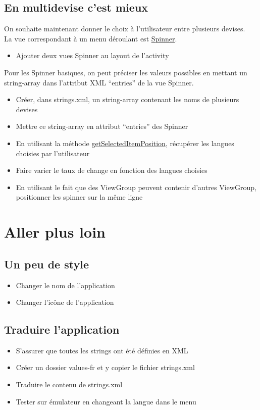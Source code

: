 \documentclass{article}
\begin{document}
\subsection{En multidevise c'est mieux}
On souhaite maintenant donner le choix à l'utilisateur entre plusieurs
devises.\\
La vue correspondant à un menu déroulant est
\href{http://developer.android.com/guide/topics/ui/controls/spinner.html}{Spinner}.
\begin{itemize}
\item Ajouter deux vues Spinner au layout de l'activity
\end{itemize}
Pour les Spinner basiques, on peut préciser les valeurs possibles en
mettant un string-array dans l'attribut XML ``entries'' de la vue Spinner.
\begin{itemize}
\item Créer, dans strings.xml, un string-array contenant les noms de plusieurs
devises
\item Mettre ce string-array en attribut ``entries'' des Spinner
\item En utilisant la méthode
\href{http://developer.android.com/reference/android/widget/AdapterView.html#getSelectedItemPosition()}{getSelectedItemPosition}, récupérer les langues choisies par l'utilisateur
\item Faire varier le taux de change en fonction des langues choisies
\item En utilisant le fait que des ViewGroup peuvent contenir d'autres
ViewGroup, positionner les spinner sur la même ligne
\end{itemize}
\section{Aller plus loin}
\subsection{Un peu de style}
\begin{itemize}
\item Changer le nom de l'application
\item Changer l'icône de l'application
\end{itemize}
\subsection{Traduire l'application}
\begin{itemize}
\item S'assurer que toutes les strings ont été définies en XML
\item Créer un dossier values-fr et y copier le fichier strings.xml
\item Traduire le contenu de strings.xml
\item Tester sur émulateur en changeant la langue dans le menu
\end{itemize}
\end{document}
